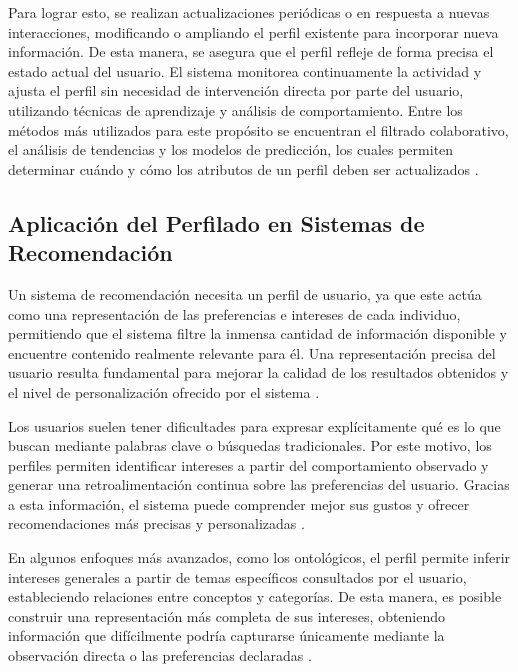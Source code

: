 Para lograr esto, se realizan actualizaciones periódicas o en respuesta a nuevas interacciones, modificando o ampliando el perfil existente para incorporar nueva información. De esta manera, se asegura que el perfil refleje de forma precisa el estado actual del usuario. El sistema monitorea continuamente la actividad y ajusta el perfil sin necesidad de intervención directa por parte del usuario, utilizando técnicas de aprendizaje y análisis de comportamiento. Entre los métodos más utilizados para este propósito se encuentran el filtrado colaborativo, el análisis de tendencias y los modelos de predicción, los cuales permiten determinar cuándo y cómo los atributos de un perfil deben ser actualizados \parencite{EkeEtAl2019}.

\subsection{Aplicación del Perfilado en Sistemas de Recomendación}\label{subsec:aplicacion_perfilado}

Un sistema de recomendación necesita un perfil de usuario, ya que este actúa como una representación de las preferencias e intereses de cada individuo, permitiendo que el sistema filtre la inmensa cantidad de información disponible y encuentre contenido realmente relevante para él. Una representación precisa del usuario resulta fundamental para mejorar la calidad de los resultados obtenidos y el nivel de personalización ofrecido por el sistema \parencite{EkeEtAl2019}.

Los usuarios suelen tener dificultades para expresar explícitamente qué es lo que buscan mediante palabras clave o búsquedas tradicionales. Por este motivo, los perfiles permiten identificar intereses a partir del comportamiento observado y generar una retroalimentación continua sobre las preferencias del usuario. Gracias a esta información, el sistema puede comprender mejor sus gustos y ofrecer recomendaciones más precisas y personalizadas \parencite{MiddletonEtAl2004}.

En algunos enfoques más avanzados, como los ontológicos, el perfil permite inferir intereses generales a partir de temas específicos consultados por el usuario, estableciendo relaciones entre conceptos y categorías. De esta manera, es posible construir una representación más completa de sus intereses, obteniendo información que difícilmente podría capturarse únicamente mediante la observación directa o las preferencias declaradas \parencite{MiddletonEtAl2004}.

